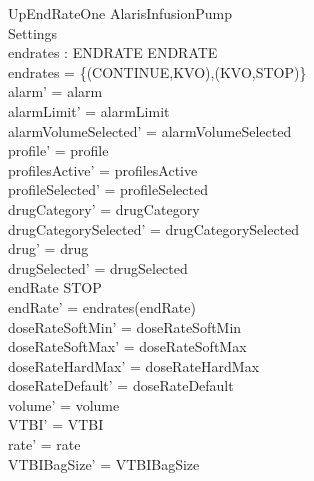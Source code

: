 \begin{schema}{UpEndRateOne}
	\Delta AlarisInfusionPump\\
	 Settings\\
	endrates : ENDRATE \rel ENDRATE\\
	\where
	endrates = \{(CONTINUE,KVO),(KVO,STOP)\}\\
	alarm' = alarm\\
	alarmLimit' = alarmLimit\\
	alarmVolumeSelected' = alarmVolumeSelected\\
	profile' = profile\\
	profilesActive' = profilesActive\\
	profileSelected' = profileSelected\\
	drugCategory' = drugCategory\\ 
	\pagebreak
	drugCategorySelected' = drugCategorySelected\\
	drug' = drug\\ 
	drugSelected' = drugSelected\\
	endRate \neq STOP\\
	endRate' = endrates(endRate)\\
	doseRateSoftMin' = doseRateSoftMin\\
	doseRateSoftMax' = doseRateSoftMax\\
	doseRateHardMax' = doseRateHardMax\\
	doseRateDefault' = doseRateDefault\\
	volume' = volume\\
	VTBI' = VTBI\\
	rate' = rate\\
	VTBIBagSize' = VTBIBagSize\\ 

\end{schema}
